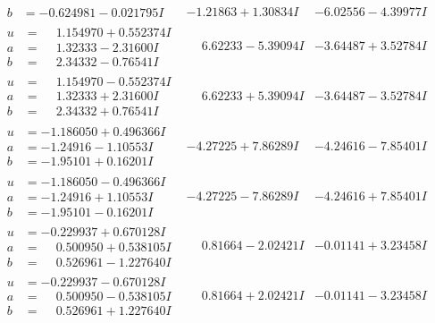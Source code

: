 \documentclass[1p]{elsarticle_modified}
\theoremstyle{definition}
\begin{document}
$$\begin{array}{c|c|c}
\begin{aligned}
b &= -0.624981 - 0.021795 I\end{aligned}
 & -1.21863 + 1.30834 I & -6.02556 - 4.39977 I \\ \hline\begin{aligned}
u &= \phantom{-}1.154970 + 0.552374 I \\
a &= \phantom{-}1.32333 - 2.31600 I \\
b &= \phantom{-}2.34332 - 0.76541 I\end{aligned}
 & \phantom{-}6.62233 - 5.39094 I & -3.64487 + 3.52784 I \\ \hline\begin{aligned}
u &= \phantom{-}1.154970 - 0.552374 I \\
a &= \phantom{-}1.32333 + 2.31600 I \\
b &= \phantom{-}2.34332 + 0.76541 I\end{aligned}
 & \phantom{-}6.62233 + 5.39094 I & -3.64487 - 3.52784 I \\ \hline\begin{aligned}
u &= -1.186050 + 0.496366 I \\
a &= -1.24916 - 1.10553 I \\
b &= -1.95101 + 0.16201 I\end{aligned}
 & -4.27225 + 7.86289 I & -4.24616 - 7.85401 I \\ \hline\begin{aligned}
u &= -1.186050 - 0.496366 I \\
a &= -1.24916 + 1.10553 I \\
b &= -1.95101 - 0.16201 I\end{aligned}
 & -4.27225 - 7.86289 I & -4.24616 + 7.85401 I \\ \hline\begin{aligned}
u &= -0.229937 + 0.670128 I \\
a &= \phantom{-}0.500950 + 0.538105 I \\
b &= \phantom{-}0.526961 - 1.227640 I\end{aligned}
 & \phantom{-}0.81664 - 2.02421 I & -0.01141 + 3.23458 I \\ \hline\begin{aligned}
u &= -0.229937 - 0.670128 I \\
a &= \phantom{-}0.500950 - 0.538105 I \\
b &= \phantom{-}0.526961 + 1.227640 I\end{aligned}
 & \phantom{-}0.81664 + 2.02421 I & -0.01141 - 3.23458 I \\ \hline\begin{aligned}

\end{aligned}
\end{array}$$
\end{document}
